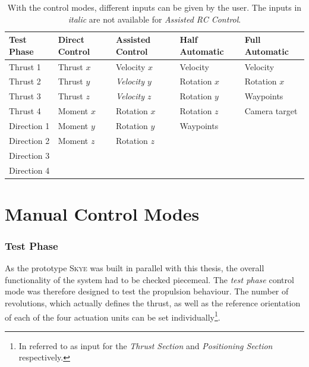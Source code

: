 \begin{table}[h]		%
	\begin{tabular}{l l l l l} %
	Test Phase 		& Direct Control 	& Assisted Control 	& Half Automatic	& Full Automatic  \\
	\toprule[1.25pt]				%
	Thrust 1		& Thrust $x$	& Velocity $x$	& Velocity	& Velocity	\\
	Thrust 2		& Thrust $y$	& \textit{Velocity $y$}	& Rotation $x$	& Rotation $x$\\
	Thrust 3		& Thrust $z$	& \textit{Velocity $z$}	& Rotation $y$	& Waypoints	\\
	Thrust 4		& Moment $x$	& Rotation $x$	& Rotation $z$	&	Camera target\\
	Direction 1		& Moment $y$	& Rotation $y$	& Waypoints	&	\\
	Direction 2		& Moment $z$	& Rotation $z$	&		&	\\
	Direction 3		& 		& 		&		&	\\
	Direction 4		& 		& 		&		&	\\

	\bottomrule[1.25pt]
	\end{tabular} 
	\caption[The different control modes]{With the control modes, different inputs can be given by the user. The inputs in \textit{italic} are not available for \textit{Assisted RC  Control}.}
	\label{tab:control_modes}
\end{table}

\section{Manual Control Modes}
\label{sec:manualControlModes}
\subsubsection{Test Phase} 
As the prototype \textsc{Skye} was built in parallel with this thesis, the overall functionality of the system had to be checked piecemeal. The \textit{test phase} control mode was therefore designed to test the propulsion behaviour. The number of revolutions, which actually defines the thrust, as well as the reference orientation of each of the four actuation units can be set individually\footnote{In \cite{schaffnervu} referred to as input for the \textit{Thrust Section} and \textit{Positioning Section} respectively.}.

